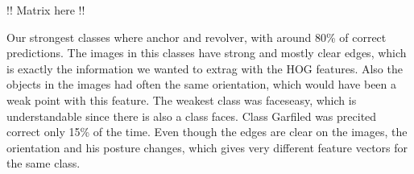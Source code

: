 \documentclass[a4paper,10pt]{article}
\begin{document}
!! Matrix here !!

Our strongest classes where anchor and revolver, with around 80\% of correct predictions. 
The images in this classes have strong and mostly clear edges, which is exactly the information we wanted to extrag with the HOG features. 
Also the objects in the images had often the same orientation, which would have been a weak point with this feature.
The weakest class was faceseasy, which is understandable since there is also a class faces. Class Garfiled was precited correct only 15\% of the time. Even though the edges are clear on the images, the orientation and his posture changes, which gives very different feature vectors for the same class. 



\end{document}
